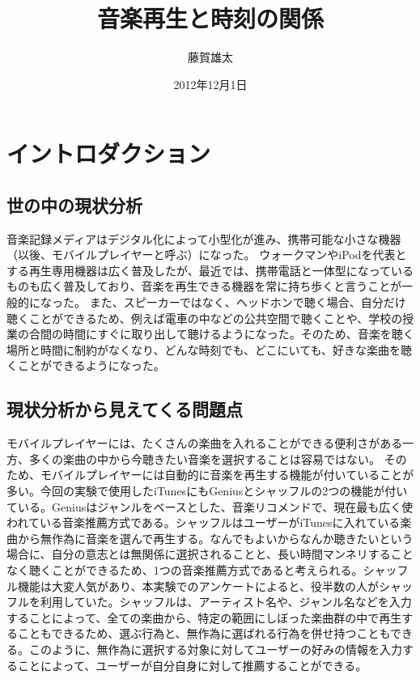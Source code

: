 \documentclass[11pt, twocolumn]{jsarticle}
\begin{document}
\title{音楽再生と時刻の関係}
\author{藤賀雄太}
\date{2012年12月1日}
\maketitle

\section{イントロダクション}
\subsection{世の中の現状分析}
音楽記録メディアはデジタル化によって小型化が進み、携帯可能な小さな機器（以後、モバイルプレイヤーと呼ぶ）になった。
ウォークマンやiPodを代表とする再生専用機器は広く普及したが、最近では、携帯電話と一体型になっているものも広く普及しており、音楽を再生できる機器を常に持ち歩くと言うことが一般的になった。
また、スピーカーではなく、ヘッドホンで聴く場合、自分だけ聴くことができるため、例えば電車の中などの公共空間で聴くことや、学校の授業の合間の時間にすぐに取り出して聴けるようになった。そのため、音楽を聴く場所と時間に制約がなくなり、どんな時刻でも、どこにいても、好きな楽曲を聴くことができるようになった。

\subsection{現状分析から見えてくる問題点}
モバイルプレイヤーには、たくさんの楽曲を入れることができる便利さがある一方、多くの楽曲の中から今聴きたい音楽を選択することは容易ではない。
そのため、モバイルプレイヤーには自動的に音楽を再生する機能が付いていることが多い。今回の実験で使用したiTunesにもGeniusとシャッフルの2つの機能が付いている。Geniusはジャンルをベースとした、音楽リコメンドで、現在最も広く使われている音楽推薦方式である。シャッフルはユーザーがiTunesに入れている楽曲から無作為に音楽を選んで再生する。なんでもよいからなんか聴きたいという場合に、自分の意志とは無関係に選択されることと、長い時間マンネリすることなく聴くことができるため、1つの音楽推薦方式であると考えられる。シャッフル機能は大変人気があり、本実験でのアンケートによると、役半数の人がシャッフルを利用していた。シャッフルは、アーティスト名や、ジャンル名などを入力することによって、全ての楽曲から、特定の範囲にしぼった楽曲群の中で再生することもできるため、選ぶ行為と、無作為に選ばれる行為を併せ持つこともできる。このように、無作為に選択する対象に対してユーザーの好みの情報を入力することによって、ユーザーが自分自身に対して推薦することができる。
\end{document}
